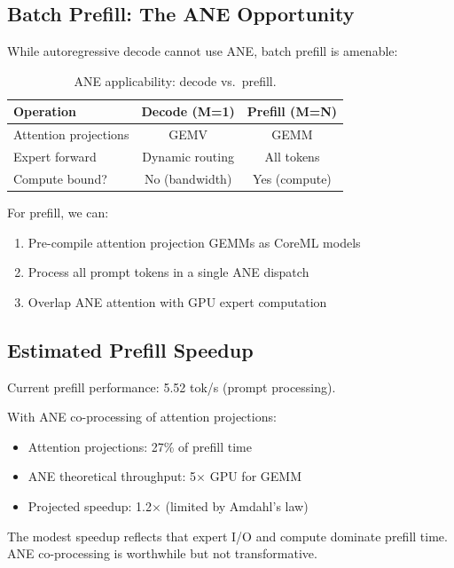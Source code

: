 \documentclass[11pt,twocolumn]{article}
\begin{document}
\subsection{Batch Prefill: The ANE Opportunity}

While autoregressive decode cannot use ANE, batch prefill is amenable:

\vspace{0.5em}
\begin{table}[t]
\centering
\caption{ANE applicability: decode vs.\ prefill.}
\label{tab:ane-compare}
\begin{tabular}{lcc}
\toprule
\textbf{Operation} & \textbf{Decode (M=1)} & \textbf{Prefill (M=N)} \\
\midrule
Attention projections & GEMV & GEMM \\
Expert forward & Dynamic routing & All tokens \\
Compute bound? & No (bandwidth) & Yes (compute) \\
\bottomrule
\end{tabular}
\end{table}
\vspace{0.5em}

For prefill, we can:
\begin{enumerate}
    \item Pre-compile attention projection GEMMs as CoreML models
    \item Process all prompt tokens in a single ANE dispatch
    \item Overlap ANE attention with GPU expert computation
\end{enumerate}

\subsection{Estimated Prefill Speedup}

Current prefill performance: 5.52 tok/s (prompt processing).

With ANE co-processing of attention projections:
\begin{itemize}
    \item Attention projections: 27\% of prefill time
    \item ANE theoretical throughput: 5$\times$ GPU for GEMM
    \item Projected speedup: 1.2$\times$ (limited by Amdahl's law)
\end{itemize}

The modest speedup reflects that expert I/O and compute dominate prefill time. ANE co-processing is worthwhile but not transformative.
\end{document}
